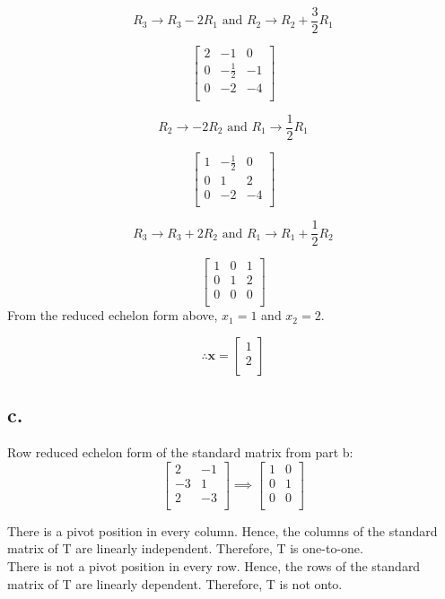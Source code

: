 \documentclass[12pt, a4paper]{article}
\begin{document}
\[
    R_3 \rightarrow R_3 - 2R_1 \text{ and } R_2 \rightarrow R_2 + \frac{3}{2}R_1
\]

\[
    \begin{bmatrix}
        2 & -1 & 0 \\
        0 & -\frac{1}{2} & -1 \\
        0 & -2 & -4 \\
    \end{bmatrix}
\]

\[
    R_2 \rightarrow -2R_2 \text{ and } R_1 \rightarrow \frac{1}{2}R_1
\]

\[
    \begin{bmatrix}
        1 & -\frac{1}{2} & 0 \\
        0 & 1 & 2 \\
        0 & -2 & -4 \\
    \end{bmatrix}
\]

\[
    R_3 \rightarrow R_3 + 2R_2 \text{ and } R_1 \rightarrow R_1 + \frac{1}{2}R_2
\]

\[
    \begin{bmatrix}
        1 & 0 & 1 \\
        0 & 1 & 2 \\
        0 & 0 & 0 \\
    \end{bmatrix}
\]
From the reduced echelon form above, $x_1 = 1$ and $x_2 = 2$.

\[
    \therefore \boldsymbol{x} = \begin{bmatrix}
        1 \\
        2 \\
    \end{bmatrix}
\]

\subsection*{c.}
Row reduced echelon form of the standard matrix from part b:
\[
    \begin{bmatrix}
        2 & -1 \\
        -3 & 1 \\
        2 & -3 \\
    \end{bmatrix} \implies \begin{bmatrix}
        1 & 0 \\
        0 & 1 \\
        0 & 0 \\
    \end{bmatrix}
\]

There is a pivot position in every column. Hence, the columns of the standard matrix of T are linearly independent. Therefore, T is one-to-one. \\

There is not a pivot position in every row. Hence, the rows of the standard matrix of T are linearly dependent. Therefore, T is not onto.
\end{document}
